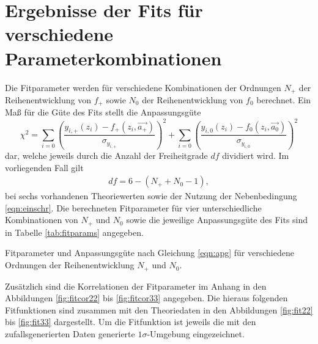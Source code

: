 \section{Ergebnisse der Fits für verschiedene Parameterkombinationen}
\label{sec:fits}

Die Fitparameter werden für verschiedene Kombinationen der Ordnungen $N_+$ der Reihenentwicklung von $f_+$ sowie $N_0$ der Reihenentwicklung von $f_0$ berechnet.
Ein Maß für die Güte des Fits stellt die Anpassungsgüte 
\begin{equation}
  \label{eqn:apg}
  \chi^2 = \sum_{i=0}^{} \left( \frac{y_{i,+}(z_i) - f_{+}(z_i, \vec{a_+})}{\sigma_{y_{i,+}}} \right)^2 + \sum_{i=0}^{} \left( \frac{y_{i,0}(z_i) - f_{0}(z_i, \vec{a_0})}{\sigma_{y_{i,0}}}  \right)^2
\end{equation}
dar, welche jeweils durch die Anzahl der Freiheitgrade $df$ dividiert wird.
Im vorliegenden Fall gilt 
\begin{align*}
  df = 6 - (N_+ + N_0 - 1),
\end{align*}
bei sechs vorhandenen Theoriewerten sowie der Nutzung der Nebenbedingung \eqref{eqn:einschr}.
Die berechneten Fitparameter für vier unterschiedliche Kombinationen von $N_+$ und $N_0$ sowie die jeweilige Anpassungsgüte des Fits sind in Tabelle \ref{tab:fitparams} angegeben.
\begin{table}
  \centering
  \caption{Fitparameter und Anpassungsgüte nach Gleichung \eqref{eqn:apg} für verschiedene Ordnungen der Reihenentwicklung $N_+$ und $N_0$.}
  \begin{subtable}{0.48\textwidth}
    \centering
    
  \end{subtable}
  \begin{subtable}{0.48\textwidth}
    \centering
    
  \end{subtable}
  \begin{subtable}[t]{0.48\textwidth}
    \vspace{15px}
    \centering
    
  \end{subtable}
  \begin{subtable}[t]{0.48\textwidth}
    \vspace{15px}
    \centering
    
  \end{subtable}
  \vspace{10px}
  \label{tab:fitparams}
\end{table}
Zusätzlich sind die Korrelationen der Fitparameter im Anhang in den Abbildungen \ref{fig:fitcor22} bis \ref{fig:fitcor33} angegeben.
Die hieraus folgenden Fitfunktionen sind zusammen mit den Theoriedaten in den Abbildungen \ref{fig:fit22} bis \ref{fig:fit33} dargestellt.
Um die Fitfunktion ist jeweils die mit den zufallsgenerierten Daten generierte $\num{1}\sigma$-Umgebung eingezeichnet.

